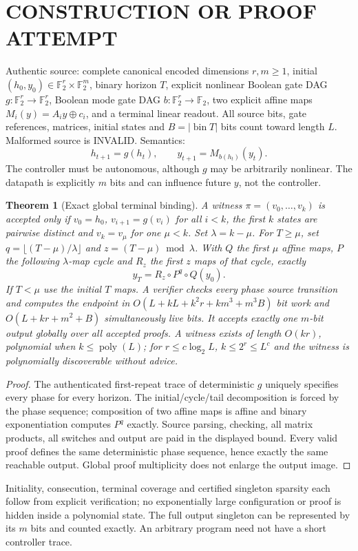 \documentclass[11pt]{article}
\newtheorem{theorem}{Theorem}
\begin{document}
\section{CONSTRUCTION OR PROOF ATTEMPT}
Authentic source: complete canonical encoded dimensions $r,m\ge1$, initial $(h_0,y_0)\in\mathbb F_2^r\times\mathbb F_2^m$, binary horizon $T$, explicit nonlinear Boolean gate DAG $g:\mathbb F_2^r\to\mathbb F_2^r$, Boolean mode gate DAG $b:\mathbb F_2^r\to\mathbb F_2$, two explicit affine maps $M_i(y)=A_iy\oplus c_i$, and a terminal linear readout. All source bits, gate references, matrices, initial states and $B=|\operatorname{bin}T|$ bits count toward length $L$. Malformed source is INVALID. Semantics:
\[
h_{t+1}=g(h_t),\qquad y_{t+1}=M_{b(h_t)}(y_t).
\]
The controller must be autonomous, although $g$ may be arbitrarily nonlinear. The datapath is explicitly $m$ bits and can influence future $y$, not the controller.

\begin{theorem}[Exact global terminal binding]
A witness $\pi=(v_0,\ldots,v_k)$ is accepted only if $v_0=h_0$, $v_{i+1}=g(v_i)$ for all $i<k$, the first $k$ states are pairwise distinct and $v_k=v_\mu$ for one $\mu<k$. Set $\lambda=k-\mu$. For $T\ge\mu$, set $q=\lfloor(T-\mu)/\lambda\rfloor$ and $z=(T-\mu)\bmod\lambda$. With $Q$ the first $\mu$ affine maps, $P$ the following $\lambda$-map cycle and $R_z$ the first $z$ maps of that cycle, exactly
\[
 y_T=R_z\circ P^q\circ Q(y_0).
\]
If $T<\mu$ use the initial $T$ maps. A verifier checks every phase source transition and computes the endpoint in
$O(L+kL+k^2r+km^3+m^3B)$ bit work and $O(L+kr+m^2+B)$ simultaneously live bits. It accepts \emph{exactly one} $m$-bit output globally over all accepted proofs. A witness exists of length $O(kr)$, polynomial when $k\le\operatorname{poly}(L)$; for $r\le c\log_2 L$, $k\le2^r\le L^c$ and the witness is polynomially discoverable without advice.
\end{theorem}
\begin{proof}
The authenticated first-repeat trace of deterministic $g$ uniquely specifies every phase for every horizon. The initial/cycle/tail decomposition is forced by the phase sequence; composition of two affine maps is affine and binary exponentiation computes $P^q$ exactly. Source parsing, checking, all matrix products, all switches and output are paid in the displayed bound. Every valid proof defines the same deterministic phase sequence, hence exactly the same reachable output. Global proof multiplicity does not enlarge the output image.
\end{proof}
Initiality, consecution, terminal coverage and certified singleton sparsity each follow from explicit verification; no exponentially large configuration or proof is hidden inside a polynomial state. The full output singleton can be represented by its $m$ bits and counted exactly. An arbitrary program need not have a short controller trace.
\end{document}
